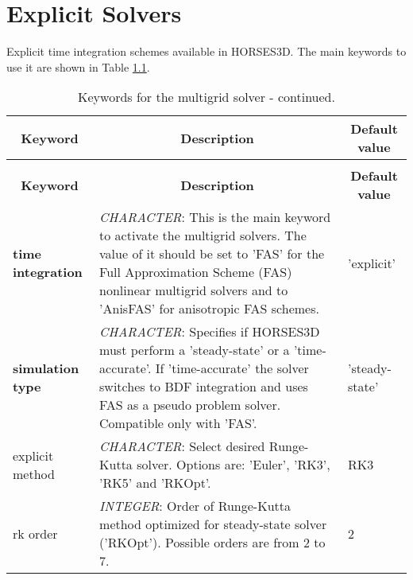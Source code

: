 \documentclass[a4paper,10pt]{report}
\begin{document}

\chapter{Explicit Solvers}

Explicit time integration schemes available in HORSES3D.
The main keywords to use it are shown in Table \ref{tab:explicitKey}.

\begin{longtable}{|p{4cm}|p{10cm}|p{2.2cm}|}
\caption{Keywords for the multigrid solver.} \label{tab:explicitKey} \\
\hline
\multicolumn{1}{|c|}{\textbf{Keyword}} & \multicolumn{1}{c|}{\textbf{Description}} & \multicolumn{1}{c|}{\textbf{Default value}} \\ \hline
\endfirsthead

\caption{Keywords for the multigrid solver - continued.} \\
\hline
\multicolumn{1}{|c|}{\textbf{Keyword}} & \multicolumn{1}{c|}{\textbf{Description}} & \multicolumn{1}{c|}{\textbf{Default value}} \\ \hline
\endhead

\textbf{time integration} & \textit{CHARACTER}: This is the main keyword to activate the multigrid solvers. The value of it should be set to 'FAS' for the Full Approximation Scheme (FAS) nonlinear multigrid  solvers and to 'AnisFAS' for anisotropic FAS schemes. & 'explicit' \\ \hline

\textbf{simulation type} & \textit{CHARACTER}: Specifies if HORSES3D must perform a ’steady-state’ or a ’time-accurate’. If 'time-accurate' the solver switches to BDF integration and uses FAS as a pseudo problem solver. Compatible only with 'FAS'. & 'steady-state' \\ \hline

explicit method & \textit{CHARACTER}: Select desired Runge-Kutta solver. Options are: 'Euler', 'RK3', 'RK5' and 'RKOpt'. & RK3 \\ \hline

rk order & \textit{INTEGER}: Order of Runge-Kutta method optimized for steady-state solver ('RKOpt'). Possible orders are from 2 to 7. & 2 \\ \hline

\end{longtable}

\end{document}
